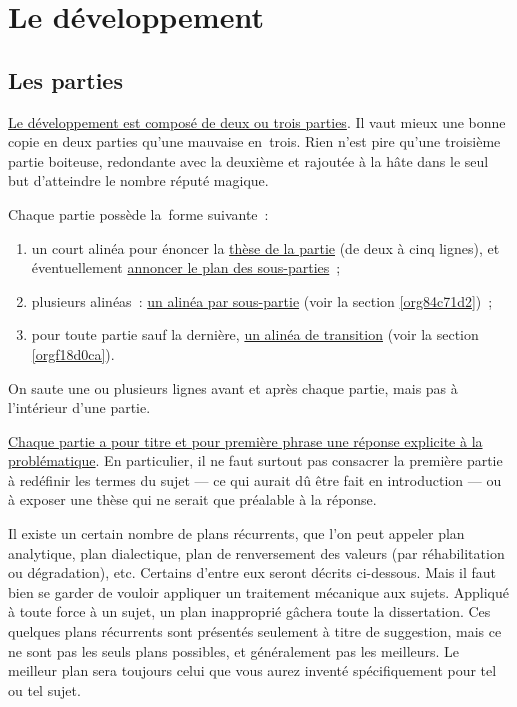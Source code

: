\documentclass[a4paper,12pt]{report}
\begin{document}
\chapter{Le développement}
\label{sec:orgf13fbac}
\label{orgc7811f7}

\section{Les parties}
\label{sec:org50d1f01}
\label{orgb36d013}

\uline{Le développement est composé de deux ou trois parties}. Il vaut mieux
une bonne copie en deux parties qu'une mauvaise en trois. Rien n'est
pire qu'une troisième partie boiteuse, redondante avec la deuxième et
rajoutée à la hâte dans le seul but d'atteindre le nombre réputé
magique.

Chaque partie possède la forme suivante :

\begin{enumerate}
\item un court alinéa pour énoncer la \uline{thèse de la partie} (de deux à cinq
lignes), et éventuellement \uline{annoncer le plan des sous-parties} ;
\item plusieurs alinéas : \uline{un alinéa par sous-partie} (voir la section
\ref{org84c71d2}) ;
\item pour toute partie sauf la dernière, \uline{un alinéa de transition} (voir
la section \ref{orgf18d0ca}).
\end{enumerate}

On saute une ou plusieurs lignes avant et après chaque partie, mais pas
à l'intérieur d'une partie.

\uline{Chaque partie a pour titre et pour première phrase une réponse
explicite à la problématique}. En particulier, il ne faut surtout pas
consacrer la première partie à redéfinir les termes du sujet --- ce qui
aurait dû être fait en introduction --- ou à exposer une thèse qui ne
serait que préalable à la réponse.

Il existe un certain nombre de plans récurrents, que l'on peut appeler
plan analytique, plan dialectique, plan de renversement des valeurs (par
réhabilitation ou dégradation), etc. Certains d'entre eux seront décrits
ci-dessous. Mais il faut bien se garder de vouloir appliquer un
traitement mécanique aux sujets. Appliqué à toute force à un sujet, un
plan inapproprié gâchera toute la dissertation. Ces quelques plans
récurrents sont présentés seulement à titre de suggestion, mais ce ne
sont pas les seuls plans possibles, et généralement pas les meilleurs.
Le meilleur plan sera toujours celui que vous aurez inventé
spécifiquement pour tel ou tel sujet.
\end{document}
